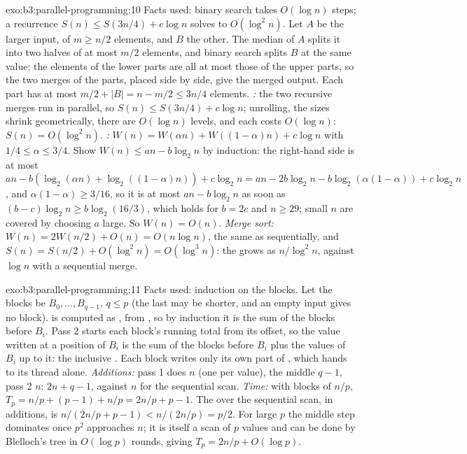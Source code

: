 \begin{solution}{exo:b3:parallel-programming:10}
Facts used: binary search takes $O(\log n)$ steps; a recurrence $S(n) \le S(3n/4) + c \log n$ solves to $O(\log^2 n)$. Let $A$ be the larger input, of $m \ge n/2$ elements, and $B$ the other. The median of $A$ splits it into two halves of at most $m/2$ elements, and binary search splits $B$ at the same value; the elements of the lower parts are all at most those of the upper parts, so the two merges of the parts, placed side by side, give the merged output. Each part has at most $m/2 + |B| = n - m/2 \le 3n/4$ elements. \emph{:} the two recursive merges run in parallel, so $S(n) \le S(3n/4) + c\log n$; unrolling, the sizes shrink geometrically, there are $O(\log n)$ levels, and each costs $O(\log n)$: $S(n) = O(\log^2 n)$. \emph{:} $W(n) = W(\alpha n) + W((1 - \alpha)n) + c\log n$ with $1/4 \le \alpha \le 3/4$. Show $W(n) \le an - b\log_2 n$ by induction: the right-hand side is at most $an - b(\log_2(\alpha n) + \log_2((1 - \alpha)n)) + c\log_2 n = an - 2b\log_2 n - b\log_2(\alpha(1 - \alpha)) + c\log_2 n$, and $\alpha(1 - \alpha) \ge 3/16$, so it is at most $an - b\log_2 n$ as soon as $(b - c)\log_2 n \ge b\log_2(16/3)$, which holds for $b = 2c$ and $n \ge 29$; small $n$ are covered by choosing $a$ large. So $W(n) = O(n)$. \emph{Merge sort:} $W(n) = 2W(n/2) + O(n) = O(n\log n)$, the same  as sequentially, and $S(n) = S(n/2) + O(\log^2 n) = O(\log^3 n)$: the  grows as $n/\log^2 n$, against $\log n$ with a sequential merge.
\end{solution}

\begin{solution}{exo:b3:parallel-programming:11}
Facts used: induction on the blocks. Let the blocks be $B_0, \ldots, B_{q-1}$, $q \le p$ (the last may be shorter, and an empty input gives no block).  is computed as , from , so by induction it is the sum of the blocks before $B_i$. Pass 2 starts each block's running total from its offset, so the value written at a position of $B_i$ is the sum of the blocks before $B_i$ plus the values of $B_i$ up to it: the inclusive . Each block writes only its own part of , which  hands to its thread alone. \emph{Additions:} pass 1 does $n$ (one per value), the middle $q - 1$, pass 2 $n$: $2n + q - 1$, against $n$ for the sequential scan. \emph{Time:} with blocks of $n/p$, $T_p = n/p + (p - 1) + n/p = 2n/p + p - 1$. The  over the sequential scan, in additions, is $n/(2n/p + p - 1) < n/(2n/p) = p/2$. For large $p$ the middle step dominates once $p^2$ approaches $n$; it is itself a scan of $p$ values and can be done by Blelloch's tree in $O(\log p)$ rounds, giving $T_p = 2n/p + O(\log p)$.
\end{solution}

